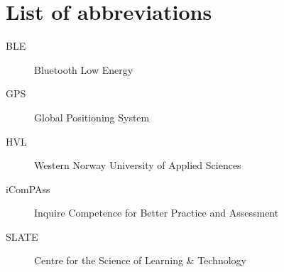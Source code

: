 \documentclass[../Main/thesis.tex]{subfiles}
\begin{document}
\chapter*{List of abbreviations}
\begin{description}
\item[BLE] Bluetooth Low Energy
\item[GPS] Global Positioning System
\item[HVL] Western Norway University of Applied Sciences
\item[iComPAss] Inquire Competence for Better Practice and Assessment
\item[SLATE] Centre for the Science of Learning \& Technology
\end{description}

\blankpage
\end{document}
